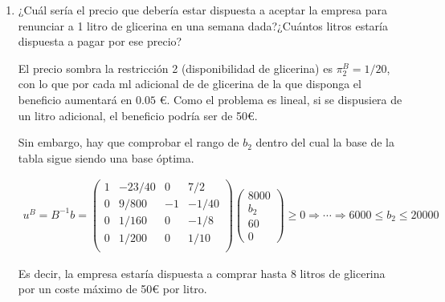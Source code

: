 \begin{enumerate}[label=\alph*)]
    \begin{equation}
    \begin{split}
    B^{-1} =\begin{pmatrix}
    1 & -23/40 & 0 & 7/2\\
    0 & 9/800 & -1 & -1/40\\
    0 & 1/160 & 0 & -1/8\\
    0 & 1/200 & 0 & 1/10\\
    \end{pmatrix}
    \end{split}
    \end{equation}

    \item ¿Cuál sería el precio que debería estar dispuesta a aceptar la empresa para renunciar a 1 litro de glicerina en una semana dada?¿Cuántos litros estaría dispuesta a pagar por ese precio?

     El precio sombra la restricción 2 (disponibilidad de glicerina) es $\pi^B_2 = 1/20$, con lo que por cada ml adicional de de glicerina de la que disponga el beneficio aumentará en $0.05$ €.  Como el problema es lineal, si se dispusiera de un litro adicional, el beneficio podría ser de 50€. 
     
     Sin embargo, hay que comprobar el rango de $b_2$ dentro del cual la base de la tabla sigue siendo una base óptima.
     
    \begin{equation}
    \begin{split}
    u^B=B^{-1}b =\begin{pmatrix}
    1 & -23/40 & 0 & 7/2\\
    0 & 9/800 & -1 & -1/40\\
    0 & 1/160 & 0 & -1/8\\
    0 & 1/200 & 0 & 1/10\\
    \end{pmatrix}
    \begin{pmatrix}
        8000\\
        b_2\\
        60\\
        0
    \end{pmatrix}   
    \geq 0 \Rightarrow \cdots \Rightarrow 6000 \leq b_2 \leq 20000
    \end{split}
    \end{equation}

    Es decir, la empresa estaría dispuesta a comprar hasta 8 litros de glicerina por un coste máximo de 50€ por litro.

\end{enumerate}